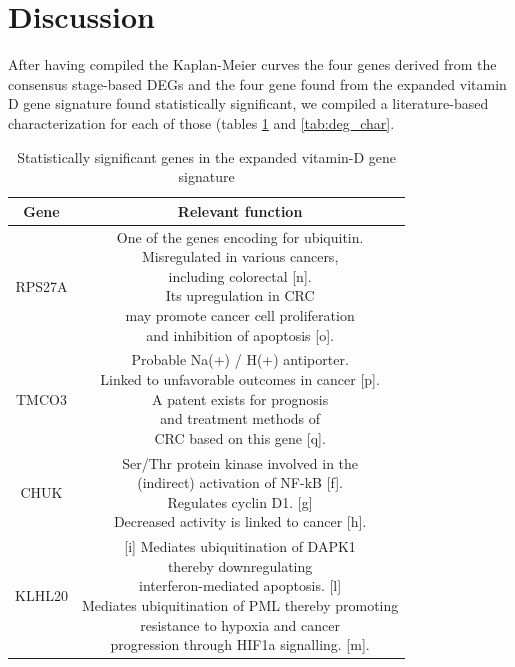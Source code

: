 \documentclass[fleqn,10pt]{SelfArx} %
\begin{document}
\section{Discussion} %
	After having compiled the Kaplan-Meier curves the four genes derived from the consensus stage-based DEGs and the four gene found from the expanded vitamin D gene signature found statistically significant, we compiled a literature-based characterization for each of those (tables \ref{tab:vit_char} and \ref{tab:deg_char}.
	\begin{table}[ht]
		\centering
		\small
		\begin{tabular}{cc}
			\hline
			Gene & Relevant function\\
			\hline
			RPS27A & \makecell{One of the genes encoding for ubiquitin.\\Misregulated in various cancers,\\including colorectal [n].\\Its upregulation in CRC\\may promote cancer cell proliferation\\and inhibition of apoptosis [o].}\\
			TMCO3 & \makecell{Probable Na(+) / H(+) antiporter.\\Linked to unfavorable outcomes in cancer [p].\\A patent exists for prognosis\\and treatment methods of\\CRC based on this gene [q].}\\
			CHUK & \makecell{Ser/Thr protein kinase involved in the\\(indirect) activation of NF-kB [f].\\Regulates cyclin D1. [g]\\Decreased activity is linked to cancer [h].}\\
			KLHL20 & \makecell{[i] Mediates ubiquitination of DAPK1\\thereby downregulating\\interferon-mediated apoptosis. [l]\\Mediates ubiquitination of PML thereby promoting\\resistance to hypoxia and cancer\\progression through HIF1a signalling. [m].}\\
			\hline
		\end{tabular}
		\caption{Statistically significant genes in the expanded vitamin-D gene signature}
		\label{tab:vit_char}
	\end{table}
\end{document}
